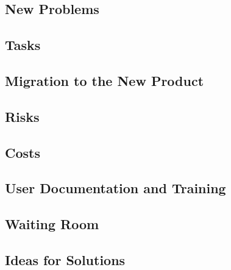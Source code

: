 \documentclass[12pt, titlepage]{article}
\begin{document}
\subsection{New Problems}

\subsection{Tasks}

\subsection{Migration to the New Product}

\subsection{Risks}

\subsection{Costs}

\subsection{User Documentation and Training}

\subsection{Waiting Room}

\subsection{Ideas for Solutions}




\end{document}
